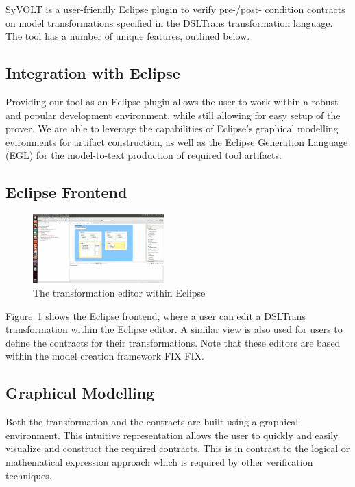 SyVOLT is a user-friendly Eclipse plugin to verify pre-/post- condition contracts on model transformations specified in the DSLTrans transformation language. The tool has a number of unique features, outlined below.

\subsection{Integration with Eclipse}

Providing our tool as an Eclipse plugin allows the user to work within a robust and popular development environment, while still allowing for easy setup of the prover. We are able to leverage the capabilities of Eclipse's graphical modelling evironments for artifact construction, as well as the Eclipse Generation Language (EGL) for the model-to-text production of required tool artifacts.

\subsection{Eclipse Frontend}
\begin{figure}
\includegraphics[width=0.45\textwidth]{figures/eclipse_frontend}
\caption{The transformation editor within Eclipse}
\label{fig:eclipse_frontend}
\end{figure}

Figure~\ref{fig:eclipse_frontend} shows the Eclipse frontend, where a user can edit a DSLTrans transformation within the Eclipse editor. A similar view is also used for users to define the contracts for their transformations. Note that these editors are based within the model creation framework FIX FIX.

\subsection{Graphical Modelling}
Both the transformation and the contracts are built using a graphical environment. This intuitive representation allows the user to quickly and easily visualize and construct the required contracts. This is in contrast to  the logical or mathematical expression approach which is required by other verification techniques.

